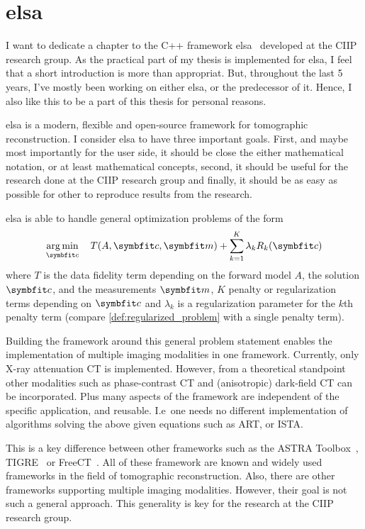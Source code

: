 \chapter{elsa}\label{chap:elsa}

I want to dedicate a chapter to the C++ framework elsa~\cite{lasser_elsa_2019} developed at the
\gls{CIIP} research group. As the practical part of my thesis is implemented for elsa, I feel that a
short introduction is more than appropriat. But, throughout the last 5 years, I've mostly been
working on either elsa, or the predecessor of it. Hence, I also like this to be a part of this
thesis for personal reasons. 

elsa is a modern, flexible and open-source framework for tomographic reconstruction. I consider elsa
to have three important goals. First, and maybe most importantly for the user side, it should be
close the either mathematical notation, or at least mathematical concepts, second, it should be
useful for the research done at the \gls{CIIP} research group and finally, it should be as easy as
possible for other to reproduce results from the research.

elsa is able to handle general optimization problems of the form
\[ \argmin_{\mvec{c}} \quad T(A, \mvec{c}, \mvec{m}) + \sum_{k=1}^K \lambda_k R_k(\mvec{c}) \]
where \(T\) is the data fidelity term depending on the forward model \(A\), the solution
\(\mvec{c}\), and the measurements \(\mvec{m}\), \(K\) penalty or regularization terms depending on
\(\mvec{c}\) and \(\lambda_k\) is a regularization parameter for the \(k\)th penalty term (compare
\autoref{def:regularized_problem} with a single penalty term).

Building the framework around this general problem statement enables the implementation of multiple
imaging modalities in one framework. Currently, only X-ray attenuation CT is implemented. However,
from a theoretical standpoint other modalities such as phase-contrast CT and (anisotropic) dark-field
CT can be incorporated. Plus many aspects of the framework are independent of the specific
application, and reusable. I.e\ one needs no different implementation of algorithms solving the
above given equations such as \gls{ART}, or \gls{ISTA}\@.

This is a key difference between other frameworks such as the ASTRA
Toolbox~\cite{van_aarle_fast_2016}, TIGRE~\cite{biguri_tigre_2016} or
FreeCT~\cite{hoffman_technical_2016}. All of these framework are known and widely used frameworks in
the field of tomographic reconstruction. Also, there are other frameworks supporting multiple
imaging modalities. However, their goal is not such a general approach. This generality is key for
the research at the \gls{CIIP} research group.

